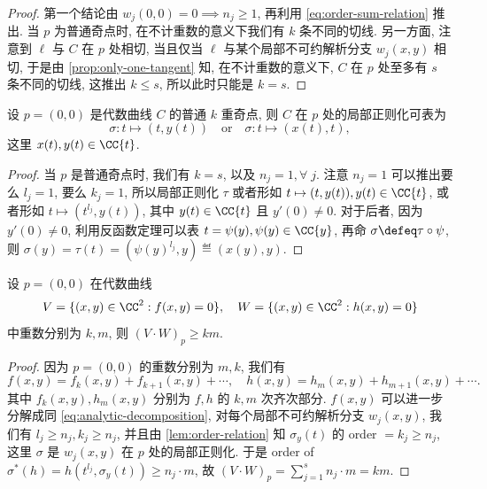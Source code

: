 \begin{proof}
第一个结论由 $w_j(0,0) = 0 \implies n_j \ge 1$, 再利用 \cref{eq:order-sum-relation} 推出.
当 $p$ 为普通奇点时,
在不计重数的意义下我们有 $k$ 条不同的切线.
另一方面, 注意到 $\ell$ 与 $C$ 在 $p$ 处相切,
当且仅当 $\ell$ 与某个局部不可约解析分支 $w_j(x,y)$ 相切,
于是由 \cref{prop:only-one-tangent} 知,
在不计重数的意义下, $C$ 在 $p$ 处至多有 $s$ 条不同的切线,
这推出 $k \le s$, 所以此时只能是 $k = s$.
\end{proof}

\begin{cor}
\label{cor:ordinary-normalization}
设 $p = (0,0)$ 是代数曲线 $C$ 的普通 $k$ 重奇点,
则 $C$ 在 $p$ 处的局部正则化可表为
\[\sigma: t \mapsto (t,y(t)) \quad \text{or} \quad \sigma: t \mapsto (x(t),t),\]
这里 $x(t), y(t) \in \CC\{t\}$.
\end{cor}

\begin{proof}
当 $p$ 是普通奇点时, 我们有 $k = s$,
以及 $n_j = 1, \forall\; j$.
注意 $n_j = 1$ 可以推出要么 $l_j = 1$, 要么 $k_j = 1$,
所以局部正则化 $\tau$
或者形如 $t \mapsto (t,y(t)), y(t) \in \CC\{t\}$,
或者形如 $t \mapsto (t^{l_j}, y(t))$, 其中 $y(t) \in \CC\{t\}$ 且 $y'(0) \ne 0$.
对于后者, 因为 $y'(0) \ne 0$, 利用反函数定理可以表 $t = \psi(y), \psi(y) \in \CC\{y\}$,
再命 $\sigma \defeq \tau\circ \psi$,
则 $\sigma(y) = \tau(t) = (\psi(y)^{l_j}, y) \eqdef (x(y), y)$.
\end{proof}

\begin{prop}
\label{prop:singularity-intersection-number}
设 $p = (0,0)$ 在代数曲线
\[V = \{(x,y) \in \CC^2:f(x,y) = 0\},\quad W = \{(x,y) \in \CC^2: h(x,y) = 0\}\]
中重数分别为 $k, m$, 则 $(V\cdot W)_p \ge km$.
\end{prop}

\begin{proof}
因为 $p = (0,0)$ 的重数分别为 $m, k$, 我们有
\[f(x,y) = f_k(x,y) + f_{k+1}(x,y) + \cdots, \quad h(x,y) = h_{m}(x,y) + h_{m+1}(x,y) + \cdots.\]
其中 $f_k(x,y), h_m(x,y)$ 分别为 $f,h$ 的 $k,m$ 次齐次部分.
$f(x,y)$ 可以进一步分解成同 \cref{eq:analytic-decomposition},
对每个局部不可约解析分支 $w_j(x,y)$, 我们有 $l_j \ge n_j, k_j \ge n_j$,
并且由 \cref{lem:order-relation} 知 $\sigma_y(t)$ 的 order $= k_j \ge n_j$,
这里 $\sigma$ 是 $w_j(x,y)$ 在 $p$ 处的局部正则化.
于是 order of $\sigma^*(h) = h(t^{l_j},\sigma_y(t)) \ge n_j\cdot m$,
故 $(V\cdot W)_p = \sum_{j=1}^s n_j\cdot m = km$.
\end{proof}

